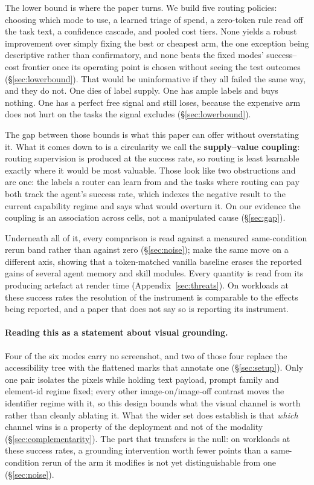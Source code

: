 The lower bound is where the paper turns. We build five routing policies: choosing which mode to use, a learned triage of spend, a zero-token rule read off the task text, a confidence cascade, and pooled cost tiers. None yields a robust improvement over simply fixing the best or cheapest arm, the one exception being descriptive rather than confirmatory, and none beats the fixed modes' success--cost frontier once its operating point is chosen without seeing the test outcomes (\S\ref{sec:lowerbound}). That would be uninformative if they all failed the same way, and they do not. One dies of label supply. One has ample labels and buys nothing. One has a perfect free signal and still loses, because the expensive arm does not hurt on the tasks the signal excludes (\S\ref{sec:lowerbound}).

The gap between those bounds is what this paper can offer without overstating it. What it comes down to is a circularity we call the \textbf{supply--value coupling}: routing supervision is produced at the success rate, so routing is least learnable exactly where it would be most valuable. Those look like two obstructions and are one: the labels a router can learn from and the tasks where routing can pay both track the agent's success rate, which indexes the negative result to the current capability regime and says what would overturn it. On our evidence the coupling is an association across cells, not a manipulated cause (\S\ref{sec:gap}).

Underneath all of it, every comparison is read against a measured same-condition rerun band rather than against zero (\S\ref{sec:noise}); \citet{hajimiri2026budgetmatched} make the same move on a different axis, showing that a token-matched vanilla baseline erases the reported gains of several agent memory and skill modules. Every quantity is read from its producing artefact at render time (Appendix~\ref{sec:threats}). On workloads at these success rates the resolution of the instrument is comparable to the effects being reported, and a paper that does not say so is reporting its instrument.

 \paragraph{Reading this as a statement about visual grounding.} Four of the six modes carry no screenshot, and two of those four replace the accessibility tree with the flattened marks that annotate one (\S\ref{sec:setup}). Only one pair isolates the pixels while holding text payload, prompt family and element-id regime fixed; every other image-on/image-off contrast moves the identifier regime with it, so this design bounds what the visual channel is worth rather than cleanly ablating it. What the wider set does establish is that \emph{which} channel wins is a property of the deployment and not of the modality (\S\ref{sec:complementarity}). The part that transfers is the null: on workloads at these success rates, a grounding intervention worth fewer points than a same-condition rerun of the arm it modifies is not yet distinguishable from one (\S\ref{sec:noise}).

